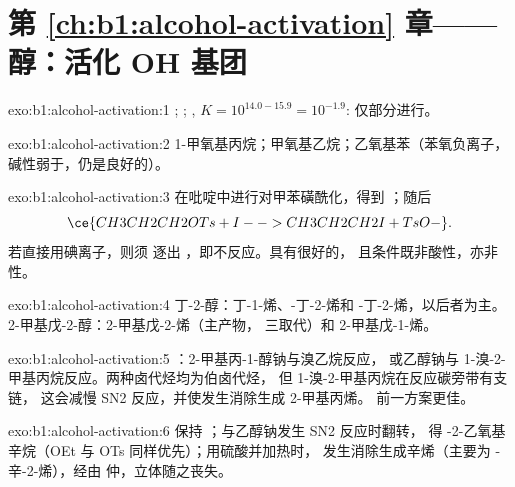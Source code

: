 \section*{第 \ref{ch:b1:alcohol-activation} 章——醇：活化 OH 基团}

\begin{solution}{exo:b1:alcohol-activation:1}
;
;
, $K = 10^{14.0 - 15.9} = 10^{-1.9}$:
仅部分进行。
\end{solution}

\begin{solution}{exo:b1:alcohol-activation:2}
1-甲氧基丙烷；甲氧基乙烷；乙氧基苯（苯氧负离子，
碱性弱于，仍是良好的）。
\end{solution}

\begin{solution}{exo:b1:alcohol-activation:3}
在吡啶中进行对甲苯磺酰化，得到 ；随后
\[ \ce{CH3CH2CH2OTs + I- -> CH3CH2CH2I + TsO-}. \] 若直接用碘离子，则须
逐出 ，即不反应。具有很好的，
且条件既非酸性，亦非性。
\end{solution}

\begin{solution}{exo:b1:alcohol-activation:4}
丁-2-醇：丁-1-烯、-丁-2-烯和
-丁-2-烯，以后者为主。2-甲基戊-2-醇：2-甲基戊-2-烯（主产物，
三取代）和 2-甲基戊-1-烯。
\end{solution}

\begin{solution}{exo:b1:alcohol-activation:5}
：2-甲基丙-1-醇钠与溴乙烷反应，
或乙醇钠与 1-溴-2-甲基丙烷反应。两种卤代烃均为伯卤代烃，
但 1-溴-2-甲基丙烷在反应碳旁带有支链，
这会减慢 SN2 反应，并使发生消除生成 2-甲基丙烯。
前一方案更佳。
\end{solution}

\begin{solution}{exo:b1:alcohol-activation:6}
保持  ；与乙醇钠发生 SN2 反应时翻转，
得 -2-乙氧基辛烷（OEt 与 OTs 同样优先）；用硫酸并加热时，
发生消除生成辛烯（主要为 -辛-2-烯），经由
仲，立体随之丧失。
\end{solution}

